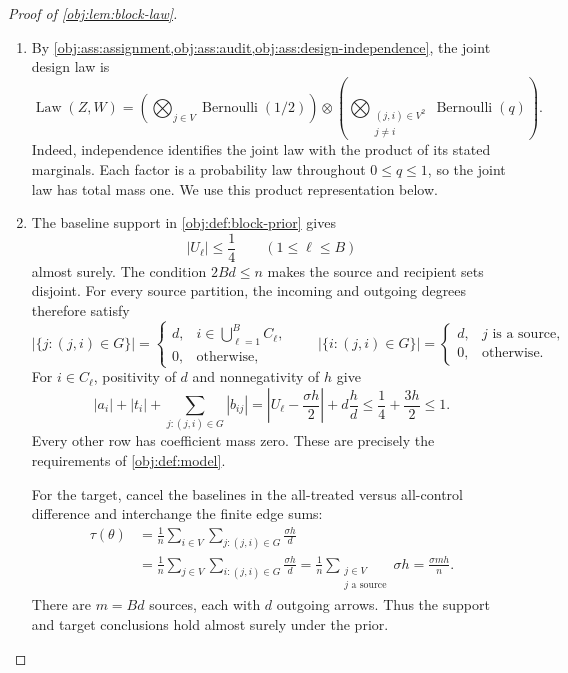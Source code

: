 \begin{proof}[Proof of \cref{obj:lem:block-law}]
\begin{enumerate}
\item By \cref{obj:ass:assignment,obj:ass:audit,obj:ass:design-independence}, the joint design law is
\[
\operatorname{Law}(Z,W)
=
\left(\bigotimes_{j\in V}\operatorname{Bernoulli}(1/2)\right)
\otimes
\left(\bigotimes_{\substack{(j,i)\in V^2\\j\ne i}}
\operatorname{Bernoulli}(q)\right).
\]
Indeed, independence identifies the joint law with the product of its stated marginals. Each factor is a probability law throughout \(0\le q\le1\), so the joint law has total mass one. We use this product representation below. %

\item The baseline support in \cref{obj:def:block-prior} gives
\[
|U_\ell|\le\frac14
\qquad(1\le\ell\le B)
\]
almost surely. The condition \(2Bd\le n\) makes the source and recipient sets disjoint. For every source partition, the incoming and outgoing degrees therefore satisfy
\[
|\{j:(j,i)\in G\}|
=
\begin{cases}
d,&i\in\bigcup_{\ell=1}^{B}C_\ell,\\
0,&\text{otherwise},
\end{cases}
\qquad
|\{i:(j,i)\in G\}|
=
\begin{cases}
d,&j\text{ is a source},\\
0,&\text{otherwise}.
\end{cases}
\]
For \(i\in C_\ell\), positivity of \(d\) and nonnegativity of \(h\) give
\[
|a_i|+|t_i|+\sum_{j:(j,i)\in G}|b_{ij}|
=
\left|U_\ell-\frac{\sigma h}{2}\right|
+d\frac{h}{d}
\le\frac14+\frac{3h}{2}
\le1.
\]
Every other row has coefficient mass zero. These are precisely the requirements of \cref{obj:def:model}.

For the target, cancel the baselines in the all-treated versus all-control difference and interchange the finite edge sums:
\[
\begin{aligned}
\tau(\theta)
&=\frac1n\sum_{i\in V}\sum_{j:(j,i)\in G}\frac{\sigma h}{d}\\
&=\frac1n\sum_{j\in V}\sum_{i:(j,i)\in G}\frac{\sigma h}{d}
=\frac1n\sum_{\substack{j\in V\\j\text{ a source}}}\sigma h
=\frac{\sigma mh}{n}.
\end{aligned}
\]
There are \(m=Bd\) sources, each with \(d\) outgoing arrows. Thus the support and target conclusions hold almost surely under the prior. %


\end{enumerate}
\end{proof}
